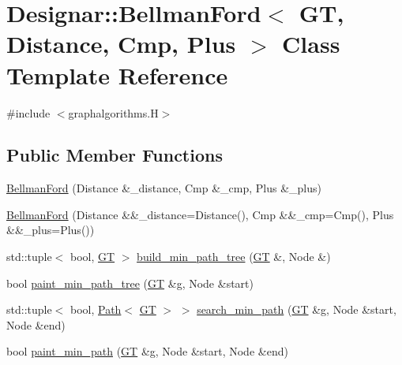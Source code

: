 \hypertarget{class_designar_1_1_bellman_ford}{}\section{Designar\+:\+:Bellman\+Ford$<$ GT, Distance, Cmp, Plus $>$ Class Template Reference}
\label{class_designar_1_1_bellman_ford}


{\ttfamily \#include $<$graphalgorithms.\+H$>$}

\subsection*{Public Member Functions}
\begin{DoxyCompactItemize}
\item 
\hyperlink{class_designar_1_1_bellman_ford_adb2ea922dfd109d977cb85a5a10873ae}{Bellman\+Ford} (Distance \&\+\_\+distance, Cmp \&\+\_\+cmp, Plus \&\+\_\+plus)
\item 
\hyperlink{class_designar_1_1_bellman_ford_adfac9f09fe6da285aaa8f8d84e9d7982}{Bellman\+Ford} (Distance \&\&\+\_\+distance=Distance(), Cmp \&\&\+\_\+cmp=Cmp(), Plus \&\&\+\_\+plus=Plus())
\item 
std\+::tuple$<$ bool, \hyperlink{demo-buildgraph_8_c_a3001c40d2c31ca87ed96cd7d1334a55e}{GT} $>$ \hyperlink{class_designar_1_1_bellman_ford_a3057f65cedb7e6d214ed838c810b557e}{build\+\_\+min\+\_\+path\+\_\+tree} (\hyperlink{demo-buildgraph_8_c_a3001c40d2c31ca87ed96cd7d1334a55e}{GT} \&, Node \&)
\item 
bool \hyperlink{class_designar_1_1_bellman_ford_a227581a852b2e97be90ac75d1aa8ad5d}{paint\+\_\+min\+\_\+path\+\_\+tree} (\hyperlink{demo-buildgraph_8_c_a3001c40d2c31ca87ed96cd7d1334a55e}{GT} \&g, Node \&start)
\item 
std\+::tuple$<$ bool, \hyperlink{class_designar_1_1_path}{Path}$<$ \hyperlink{demo-buildgraph_8_c_a3001c40d2c31ca87ed96cd7d1334a55e}{GT} $>$ $>$ \hyperlink{class_designar_1_1_bellman_ford_a2363c1e87c7e5ca8778a786db99fcff5}{search\+\_\+min\+\_\+path} (\hyperlink{demo-buildgraph_8_c_a3001c40d2c31ca87ed96cd7d1334a55e}{GT} \&g, Node \&start, Node \&end)
\item 
bool \hyperlink{class_designar_1_1_bellman_ford_aa3bbfc0acd202d4af5e10f7405e8a25c}{paint\+\_\+min\+\_\+path} (\hyperlink{demo-buildgraph_8_c_a3001c40d2c31ca87ed96cd7d1334a55e}{GT} \&g, Node \&start, Node \&end)
\end{DoxyCompactItemize}


